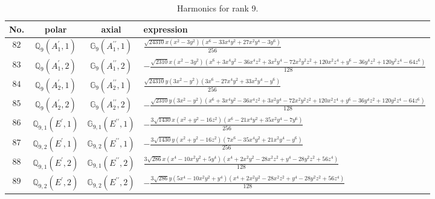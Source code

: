 \documentclass[fleqn,8pt,landscape]{jsarticle}
\begin{document}
\begin{table}[ht!]
\begin{center}
\caption{Harmonics for rank 9.}
\renewcommand{\arraystretch}{1.3}
\begin{tabular}{cccl} \hline \hline
No. & polar & axial & expression \\ \hline
$ 82 $ & $ \mathbb{Q}_{9}(A_{1}^{\prime},1) $ & $ \mathbb{G}_{9}(A_{1}^{\prime\prime},1) $ & $ \frac{\sqrt{24310} x \left(x^{2} - 3 y^{2}\right) \left(x^{6} - 33 x^{4} y^{2} + 27 x^{2} y^{4} - 3 y^{6}\right)}{256} $ \\
$ 83 $ & $ \mathbb{Q}_{9}(A_{1}^{\prime},2) $ & $ \mathbb{G}_{9}(A_{1}^{\prime\prime},2) $ & $ - \frac{\sqrt{2310} x \left(x^{2} - 3 y^{2}\right) \left(x^{6} + 3 x^{4} y^{2} - 36 x^{4} z^{2} + 3 x^{2} y^{4} - 72 x^{2} y^{2} z^{2} + 120 x^{2} z^{4} + y^{6} - 36 y^{4} z^{2} + 120 y^{2} z^{4} - 64 z^{6}\right)}{128} $ \\
$ 84 $ & $ \mathbb{Q}_{9}(A_{2}^{\prime},1) $ & $ \mathbb{G}_{9}(A_{2}^{\prime\prime},1) $ & $ \frac{\sqrt{24310} y \left(3 x^{2} - y^{2}\right) \left(3 x^{6} - 27 x^{4} y^{2} + 33 x^{2} y^{4} - y^{6}\right)}{256} $ \\
$ 85 $ & $ \mathbb{Q}_{9}(A_{2}^{\prime},2) $ & $ \mathbb{G}_{9}(A_{2}^{\prime\prime},2) $ & $ - \frac{\sqrt{2310} y \left(3 x^{2} - y^{2}\right) \left(x^{6} + 3 x^{4} y^{2} - 36 x^{4} z^{2} + 3 x^{2} y^{4} - 72 x^{2} y^{2} z^{2} + 120 x^{2} z^{4} + y^{6} - 36 y^{4} z^{2} + 120 y^{2} z^{4} - 64 z^{6}\right)}{128} $ \\
$ 86 $ & $ \mathbb{Q}_{9,1}(E^{\prime},1) $ & $ \mathbb{G}_{9,1}(E^{\prime\prime},1) $ & $ - \frac{3 \sqrt{1430} x \left(x^{2} + y^{2} - 16 z^{2}\right) \left(x^{6} - 21 x^{4} y^{2} + 35 x^{2} y^{4} - 7 y^{6}\right)}{256} $ \\
$ 87 $ & $ \mathbb{Q}_{9,2}(E^{\prime},1) $ & $ \mathbb{G}_{9,2}(E^{\prime\prime},1) $ & $ - \frac{3 \sqrt{1430} y \left(x^{2} + y^{2} - 16 z^{2}\right) \left(7 x^{6} - 35 x^{4} y^{2} + 21 x^{2} y^{4} - y^{6}\right)}{256} $ \\
$ 88 $ & $ \mathbb{Q}_{9,1}(E^{\prime},2) $ & $ \mathbb{G}_{9,1}(E^{\prime\prime},2) $ & $ \frac{3 \sqrt{286} x \left(x^{4} - 10 x^{2} y^{2} + 5 y^{4}\right) \left(x^{4} + 2 x^{2} y^{2} - 28 x^{2} z^{2} + y^{4} - 28 y^{2} z^{2} + 56 z^{4}\right)}{128} $ \\
$ 89 $ & $ \mathbb{Q}_{9,2}(E^{\prime},2) $ & $ \mathbb{G}_{9,2}(E^{\prime\prime},2) $ & $ - \frac{3 \sqrt{286} y \left(5 x^{4} - 10 x^{2} y^{2} + y^{4}\right) \left(x^{4} + 2 x^{2} y^{2} - 28 x^{2} z^{2} + y^{4} - 28 y^{2} z^{2} + 56 z^{4}\right)}{128} $ \\

\end{tabular}
\end{center}
\end{table}
\end{document}
